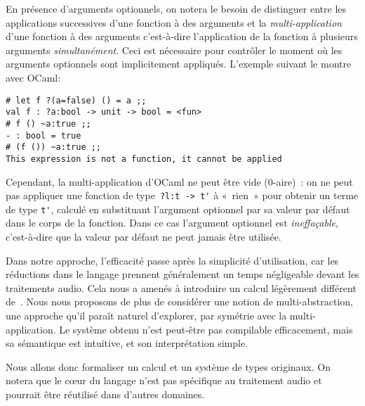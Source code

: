\documentclass[twoside]{article}
\theoremstyle{plain}
\theoremstyle{definition}
\theoremstyle{remark}
\begin{document}
En présence d'arguments optionnels, on notera le besoin
de distinguer entre les applications
successives d'une fonction à des arguments et la \emph{multi-application} d'une
fonction à des arguments c'est-à-dire l'application de la fonction à plusieurs
arguments \emph{simultanément}. Ceci est nécessaire pour contrôler le moment où 
les arguments optionnels sont implicitement appliqués.
L'exemple suivant le montre avec OCaml:
\begin{verbatim}
# let f ?(a=false) () = a ;;
val f : ?a:bool -> unit -> bool = <fun>
# f () ~a:true ;;
- : bool = true
# (f ()) ~a:true ;;
This expression is not a function, it cannot be applied
\end{verbatim}
Cependant, la multi-application d'OCaml ne peut être vide ($0$-aire)~: on ne
peut pas appliquer une fonction de type~\verb.?l:t -> t'. à «~rien~» pour
obtenir un terme de type \verb.t'., calculé en substituant l'argument optionnel
par sa valeur par défaut dans le corps de la fonction. Dans ce cas l'argument
optionnel est \emph{ineffaçable}, c'est-à-dire que la valeur par défaut ne
peut jamais être utilisée.

Dans notre approche, l'efficacité passe après la simplicité d'utilisation, car
les réductions dans le langage prennent généralement un temps négligeable
devant les traitements audio. Cela nous a amenés à introduire un calcul
légèrement différent de~\cite{furuse-garrigue:labelopt}. Nous nous
proposons de plus de
considérer une notion de multi-abstraction, une approche qu'il paraît naturel
d'explorer, par symétrie avec la multi-application.
Le système obtenu n'est
peut-être pas compilable efficacement, mais sa sémantique est intuitive, et son
interprétation simple.

Nous allons donc formaliser un calcul et un système de types originaux. On 
notera que le c\oe{}ur du langage n'est pas spécifique au traitement audio et 
pourrait être réutilisé dans d'autres domaines.



\end{document}
